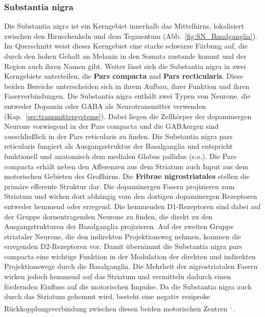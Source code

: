\subsubsection*{Substantia nigra} 
Die Substantia nigra ist ein Kerngebiet innerhalb das Mittelhirns, lokalisiert zwischen den Hirnschenkeln und dem Tegmentum (Abb.~\ref{fig:SN_Basalganglia}). Im Querschnitt weist dieses Kerngebiet eine starke schwarze Färbung auf, die durch den hohen Gehalt an Melanin in den Somata zustande kommt und der Region auch ihren Namen gibt. Weiter lässt sich die Substantia nigra in zwei Kerngebiete unterteilen, die \textbf{Pars compacta} und \textbf{Pars recticularis}. Diese beiden Bereiche unterscheiden sich in ihrem Aufbau, ihrer Funktion und ihren Faserverbindungen. Die Substantia nigra enthält zwei Typen von Neurone, die entweder Dopamin oder GABA als Neurotransmitter verwenden (Kap.~\ref{sec:transmittersysteme}). Dabei liegen die Zellkörper der dopaminergen Neurone vorwiegend in der Pars compacta und die GABAergen sind ausschließlich in der Pars reticularis zu finden. Die Substantia nigra pars reticularis fungiert als Ausgangsstruktur der Basalganglia und entspricht funktionell und anatomisch dem medialen Globus pallidus (s.o.). Die Pars compacta erhält neben den Afferenzen aus dem Striatum auch Input aus dem motorischen Gebieten des Großhirns. Die \textbf{Fribrae nigrostriatales}  stellen die primäre efferente Struktur dar. Die dopaminergen Fasern projizieren zum Striatum und wirken dort abhängig vom den dortigen dopaminergen Rezeptoren entweder hemmend oder erregend. Die hemmenden D1-Rezeptoren sind dabei auf der Gruppe dornentragenden Neurone zu finden, die direkt zu den Ausgangstrukturen der Basalganglia projizieren. Auf der zweiten Gruppe striataler Neurone, die den indirekten Projektionsweg nehmen, kommen die erregenden D2-Rezeptoren vor. Damit übernimmt die Substantia nigra pars compacta eine wichtige Funktion in der Modulation der direkten und indirekten Projektionswege durch die Basalganglia. Die Mehrheit der nigrostriatalen Fasern wirken jedoch hemmend auf das Striatum und vermitteln dadurch einen fördernden Einfluss auf die motorischen Impulse. Da die Substantia nigra auch durch das Striatum gehemmt wird, besteht eine negativ reziproke Rückkopplungsverbindung zwischen diesen beiden motorischen Zentren \textsuperscript{\cite[Kap.~17]{paxinos2014rat}, \cite[9]{trepel2011neuroanatomie}}.

